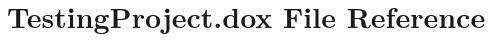 \hypertarget{TestingProject_8dox}{}\section{Testing\+Project.\+dox File Reference}
\label{TestingProject_8dox}
